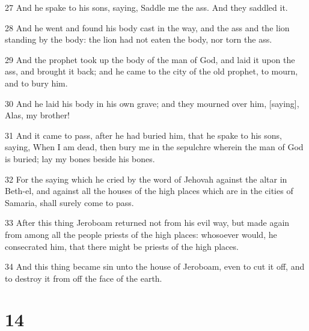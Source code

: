 \par 27 And he spake to his sons, saying, Saddle me the ass. And they saddled it.
\par 28 And he went and found his body cast in the way, and the ass and the lion standing by the body: the lion had not eaten the body, nor torn the ass.
\par 29 And the prophet took up the body of the man of God, and laid it upon the ass, and brought it back; and he came to the city of the old prophet, to mourn, and to bury him.
\par 30 And he laid his body in his own grave; and they mourned over him, [saying], Alas, my brother!
\par 31 And it came to pass, after he had buried him, that he spake to his sons, saying, When I am dead, then bury me in the sepulchre wherein the man of God is buried; lay my bones beside his bones.
\par 32 For the saying which he cried by the word of Jehovah against the altar in Beth-el, and against all the houses of the high places which are in the cities of Samaria, shall surely come to pass.
\par 33 After this thing Jeroboam returned not from his evil way, but made again from among all the people priests of the high places: whosoever would, he consecrated him, that there might be priests of the high places.
\par 34 And this thing became sin unto the house of Jeroboam, even to cut it off, and to destroy it from off the face of the earth.

\chapter{14}

